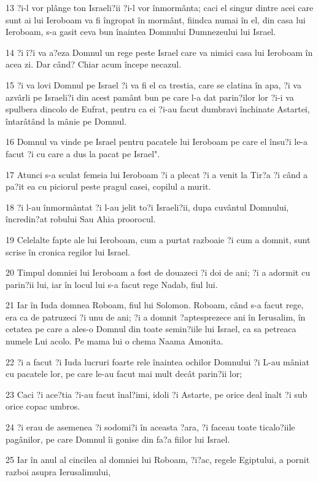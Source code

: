 \par 13 ?i-l vor plânge ton Israeli?ii ?i-l vor înmormânta; caci el singur dintre acei care sunt ai lui Ieroboam va fi îngropat în mormânt, fiindca numai în el, din casa lui Ieroboam, s-a gasit ceva bun înaintea Domnului Dumnezeului lui Israel.
\par 14 ?i î?i va a?eza Domnul un rege peste Israel care va nimici casa lui Ieroboam în acea zi. Dar când? Chiar acum începe necazul.
\par 15 ?i va lovi Domnul pe Israel ?i va fi el ca trestia, care se clatina în apa, ?i va azvârli pe Israeli?i din acest pamânt bun pe care l-a dat parin?ilor lor ?i-i va spulbera dincolo de Eufrat, pentru ca ei ?i-au facut dumbravi închinate Astartei, întarâtând la mânie pe Domnul.
\par 16 Domnul va vinde pe Israel pentru pacatele lui Ieroboam pe care el însu?i le-a facut ?i cu care a dus la pacat pe Israel".
\par 17 Atunci s-a sculat femeia lui Ieroboam ?i a plecat ?i a venit la Tir?a ?i când a pa?it ea cu piciorul peste pragul casei, copilul a murit.
\par 18 ?i l-au înmormântat ?i l-au jelit to?i Israeli?ii, dupa cuvântul Domnului, încredin?at robului Sau Ahia proorocul.
\par 19 Celelalte fapte ale lui Ieroboam, cum a purtat razboaie ?i cum a domnit, sunt scrise în cronica regilor lui Israel.
\par 20 Timpul domniei lui Ieroboam a fost de douazeci ?i doi de ani; ?i a adormit cu parin?ii lui, iar în locul lui s-a facut rege Nadab, fiul lui.
\par 21 Iar în Iuda domnea Roboam, fiul lui Solomon. Roboam, când s-a facut rege, era ca de patruzeci ?i unu de ani; ?i a domnit ?aptesprezece ani în Ierusalim, în cetatea pe care a ales-o Domnul din toate semin?iile lui Israel, ca sa petreaca numele Lui acolo. Pe mama lui o chema Naama Amonita.
\par 22 ?i a facut ?i Iuda lucruri foarte rele înaintea ochilor Domnului ?i L-au mâniat cu pacatele lor, pe care le-au facut mai mult decât parin?ii lor;
\par 23 Caci ?i ace?tia ?i-au facut înal?imi, idoli ?i Astarte, pe orice deal înalt ?i sub orice copac umbros.
\par 24 ?i erau de asemenea ?i sodomi?i în aceasta ?ara, ?i faceau toate ticalo?iile pagânilor, pe care Domnul îi gonise din fa?a fiilor lui Israel.
\par 25 Iar în anul al cincilea al domniei lui Roboam, ?i?ac, regele Egiptului, a pornit razboi asupra Ierusalimului,
